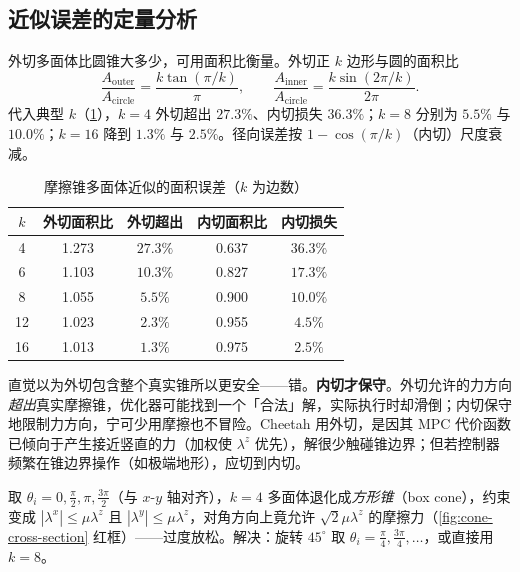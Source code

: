 \subsection{近似误差的定量分析}
\label{subsec:cone-error}

外切多面体比圆锥大多少，可用面积比衡量。外切正 $k$ 边形与圆的面积比
\begin{equation}
  \frac{A_{\mathrm{outer}}}{A_{\mathrm{circle}}}=\frac{k\tan(\pi/k)}{\pi},\qquad
  \frac{A_{\mathrm{inner}}}{A_{\mathrm{circle}}}=\frac{k\sin(2\pi/k)}{2\pi}.
  \label{eq:area-ratio}
\end{equation}
代入典型 $k$（\cref{tab:cone-error}），$k=4$ 外切超出 $27.3\%$、内切损失 $36.3\%$；$k=8$ 分别为 $5.5\%$ 与 $10.0\%$；$k=16$ 降到 $1.3\%$ 与 $2.5\%$。径向误差按 $1-\cos(\pi/k)$（内切）尺度衰减。

\begin{table}[H]\centering\small
\caption{摩擦锥多面体近似的面积误差（$k$ 为边数）}
\label{tab:cone-error}
\begin{tabular}{ccccc}
\toprule
$k$ & 外切面积比 & 外切超出 & 内切面积比 & 内切损失 \\
\midrule
4 & 1.273 & $27.3\%$ & 0.637 & $36.3\%$ \\
6 & 1.103 & $10.3\%$ & 0.827 & $17.3\%$ \\
8 & 1.055 & $5.5\%$  & 0.900 & $10.0\%$ \\
12& 1.023 & $2.3\%$  & 0.955 & $4.5\%$ \\
16& 1.013 & $1.3\%$  & 0.975 & $2.5\%$ \\
\bottomrule
\end{tabular}
\end{table}

\begin{pitfall}
直觉以为外切包含整个真实锥所以更安全——错。\textbf{内切才保守}。外切允许的力方向\emph{超出}真实摩擦锥，优化器可能找到一个「合法」解，实际执行时却滑倒；内切保守地限制力方向，宁可少用摩擦也不冒险。Cheetah 用外切，是因其 MPC 代价函数已倾向于产生接近竖直的力（加权使 $\lambda^z$ 优先），解很少触碰锥边界；但若控制器频繁在锥边界操作（如极端地形），应切到内切。
\end{pitfall}

\begin{pitfall}[思维陷阱：$k=4$ 轴对齐退化为盒形锥]
取 $\theta_i=0,\tfrac\pi2,\pi,\tfrac{3\pi}2$（与 $x$-$y$ 轴对齐），$k=4$ 多面体退化成\emph{方形锥}（box cone），约束变成 $|\lambda^x|\le\mu\lambda^z$ 且 $|\lambda^y|\le\mu\lambda^z$，对角方向上竟允许 $\sqrt2\mu\lambda^z$ 的摩擦力（\cref{fig:cone-cross-section} 红框）——过度放松。解决：旋转 $45^\circ$ 取 $\theta_i=\tfrac\pi4,\tfrac{3\pi}4,\dots$，或直接用 $k=8$。
\end{pitfall}

